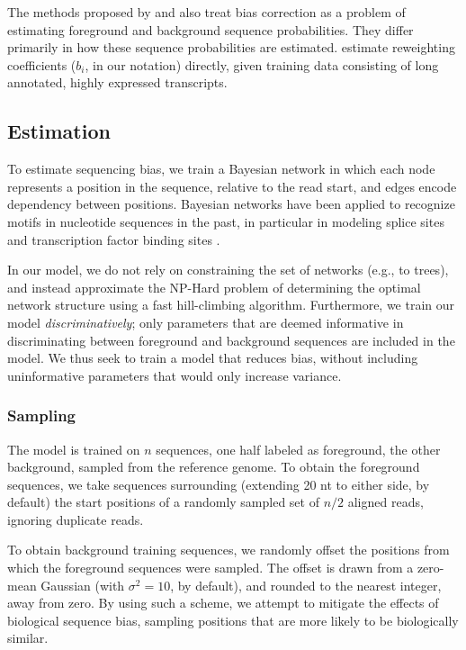 \documentclass{bioinfo}
\begin{document}
The methods proposed by \citet{Hansen2010} and \cite{Roberts2011} also treat
bias correction as a problem of estimating foreground and background sequence
probabilities. They differ primarily in how these sequence probabilities are
estimated. \citet{Li2010} estimate reweighting coefficients ($b_i$, in our
notation) directly, given training data consisting of long annotated, highly
expressed transcripts.



\subsection{Estimation}

To estimate sequencing bias, we train a Bayesian network in which each node
represents a position in the sequence, relative to the read start, and edges
encode dependency between positions.  Bayesian networks have been applied to
recognize motifs in nucleotide sequences in the past, in particular in modeling
splice sites \citep{Cai2000, Chen2005} and transcription factor binding sites
\citep{Ben-Gal2005, Grau2006, Pudimat2005}. 

In our model, we do not rely on constraining the set of networks (e.g., to
trees), and instead approximate the NP-Hard problem of determining the optimal
network structure using a fast hill-climbing algorithm. Furthermore, we
train our model \emph{discriminatively}; only parameters that are deemed
informative in discriminating between foreground and background sequences are
included in the model. We thus seek to train a model that reduces bias, without
including uninformative parameters that would only increase variance.


\subsubsection{Sampling}

The model is trained on $n$ sequences, one half labeled as foreground, the other
background, sampled from the reference genome. To obtain the foreground
sequences, we take sequences surrounding (extending 20 nt to either side, by
default) the start positions of a randomly sampled set of $n/2$ aligned reads,
ignoring duplicate reads.

To obtain background training sequences, we randomly offset the positions from
which the foreground sequences were sampled.  The offset is drawn from a
zero-mean Gaussian (with $\sigma^2 = 10$, by default), and rounded to the
nearest integer, away from zero.  By using such a scheme, we attempt to mitigate
the effects of biological sequence bias, sampling positions that are more likely
to be biologically similar.
\end{document}
